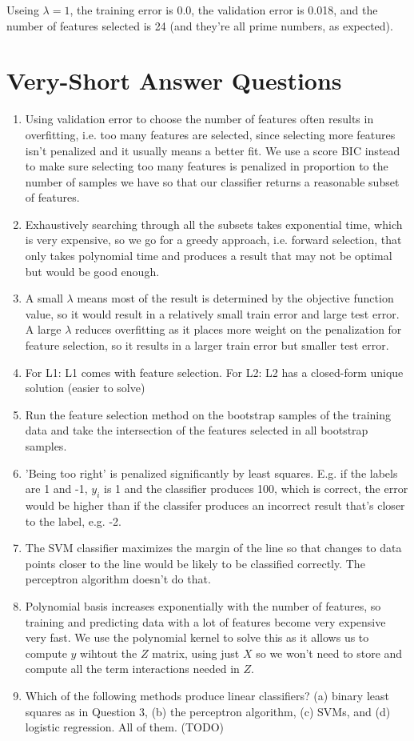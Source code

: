 \documentclass{article}
\def\enum#1{\begin{enumerate}#1\end{enumerate}}
\begin{document}
Useing $\lambda = 1$, the training error is 0.0, the validation error is 0.018, and the number of features selected is 24 (and they're all prime numbers, as expected).

\section{Very-Short Answer Questions}

\enum{
\item Using validation error to choose the number of features often results in overfitting, i.e. too many features are selected, since selecting more features isn't penalized and it usually means a better fit. We use a score BIC instead to make sure selecting too many features is penalized in proportion to the number of samples we have so that our classifier returns a reasonable subset of features.
\item Exhaustively searching through all the subsets takes exponential time, which is very expensive, so we go for a greedy approach, i.e. forward selection, that only takes polynomial time and produces a result that may not be optimal but would be good enough.
\item A small $\lambda$ means most of the result is determined by the objective function value, so it would result in a relatively small train error and large test error. A large $\lambda$ reduces overfitting as it places more weight on the penalization for feature selection, so it results in a larger train error but smaller test error.
\item For L1: L1 comes with feature selection. For L2: L2 has a closed-form unique solution (easier to solve)
\item Run the feature selection method on the bootstrap samples of the training data and take the intersection of the features selected in all bootstrap samples.
\item 'Being too right' is penalized significantly by least squares. E.g. if the labels are 1 and -1, $y_i$ is 1 and the classifier produces 100, which is correct, the error would be higher than if the classifer produces an incorrect result that's closer to the label, e.g. -2.
\item The SVM classifier maximizes the margin of the line so that changes to data points closer to the line would be likely to be classified correctly. The perceptron algorithm doesn't do that.
\item Polynomial basis increases exponentially with the number of features, so training and predicting data with a lot of features become very expensive very fast. We use the polynomial kernel to solve this as it allows us to compute $y$ wihtout the $Z$ matrix, using just $X$ so we won't need to store and compute all the term interactions needed in $Z$.
\item Which of the following methods produce linear classifiers? (a) binary least squares as in Question 3, (b) the perceptron algorithm, (c) SVMs, and (d) logistic regression. All of them. (TODO)
}
\end{document}
